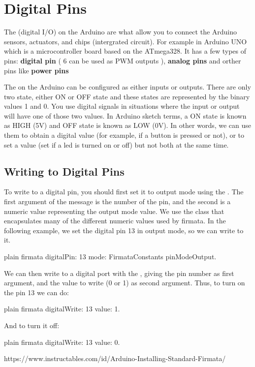 \documentclass[10pt,twoside,english]{_support/latex/sbabook/sbabook}
\begin{document}
\section{Digital Pins}
The  (digital I/O) on the Arduino are what allow you to connect the Arduino sensors, actuators, and chips (intergrated circuit).
For example in Arduino UNO which is a microcontroller board based on the ATmega328. It has a few types of pins: \textbf{digital pin} ( 6 can be used as PWM outputs ), \textbf{analog pins} and orther pins like \textbf{power pins}

The  on the Arduino can be configured as either inputs or outputs. There are only two state, either ON or OFF state and these states are represented by the binary values 1 and 0. You use digital signals in situations where the input or output will have one of those two values. In Arduino sketch terms, a ON state is known as HIGH (5V) and OFF state is known as LOW (0V). In other words, we can use them to obtain a digital value (for example, if a button is pressed or not), or to set a value (set if a led is turned on or off) but not both at the same time.
\subsection{Writing to Digital Pins}
To write to a digital pin, you should first set it to output mode using the . The first argument of the message is the number of the pin, and the second is a numeric value representing the output mode value. We use the  class that encapsulates many of the different numeric values used by firmata. In the following example, we set the digital pin 13 in output mode, so we can write to it.

\begin{displaycode}{plain}
  firmata digitalPin: 13 mode: FirmataConstants pinModeOutput.
\end{displaycode}

We can then write to a digital port with the , giving the pin number as first argument, and the value to write (0 or 1) as second argument. Thus, to turn on the pin 13 we can do:

\begin{displaycode}{plain}
  firmata digitalWrite: 13 value: 1.
\end{displaycode}

And to turn it off:

\begin{displaycode}{plain}
  firmata digitalWrite: 13 value: 0.
\end{displaycode}

https://www.instructables.com/id/Arduino-Installing-Standard-Firmata/






\backmatter

\end{document}
